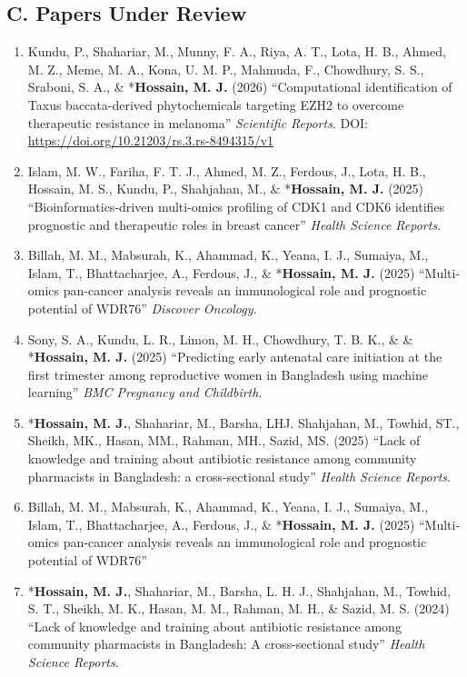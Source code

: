 \documentclass[
  11pt,
  letterpaper,
  DIV=11,
  numbers=noendperiod]{scrartcl}
\providecommand{\tightlist}{%
  \setlength{\itemsep}{0pt}\setlength{\parskip}{0pt}}
\begin{document}
\subsection{C. Papers Under Review}\label{c.-papers-under-review}

\begin{enumerate}
\def\labelenumi{\arabic{enumi}.}
\tightlist
\item
  Kundu, P., Shahariar, M., Munny, F. A., Riya, A. T., Lota, H. B.,
  Ahmed, M. Z., Meme, M. A., Kona, U. M. P., Mahmuda, F., Chowdhury, S.
  S., Sraboni, S. A., \& *\textbf{Hossain, M. J.} (2026) ``Computational
  identification of Taxus baccata-derived phytochemicals targeting EZH2
  to overcome therapeutic resistance in melanoma'' \emph{Scientific
  Reports}. DOI:
  \href{https://doi.org/https://doi.org/10.21203/rs.3.rs-8494315/v1}{https://doi.org/10.21203/rs.3.rs-8494315/v1}
\item
  Islam, M. W., Fariha, F. T. J., Ahmed, M. Z., Ferdous, J., Lota, H.
  B., Hossain, M. S., Kundu, P., Shahjahan, M., \& *\textbf{Hossain, M.
  J.} (2025) ``Bioinformatics-driven multi-omics profiling of CDK1 and
  CDK6 identifies prognostic and therapeutic roles in breast cancer''
  \emph{Health Science Reports}.\\
\item
  Billah, M. M., Mabsurah, K., Ahammad, K., Yeana, I. J., Sumaiya, M.,
  Islam, T., Bhattacharjee, A., Ferdous, J., \& *\textbf{Hossain, M. J.}
  (2025) ``Multi-omics pan-cancer analysis reveals an immunological role
  and prognostic potential of WDR76'' \emph{Discover Oncology}.\\
\item
  Sony, S. A., Kundu, L. R., Limon, M. H., Chowdhury, T. B. K., \& \&
  *\textbf{Hossain, M. J.} (2025) ``Predicting early antenatal care
  initiation at the first trimester among reproductive women in
  Bangladesh using machine learning'' \emph{BMC Pregnancy and
  Childbirth}.\\
\item
  *\textbf{Hossain, M. J.}, Shahariar, M., Barsha, LHJ. Shahjahan, M.,
  Towhid, ST., Sheikh, MK., Hasan, MM., Rahman, MH., Sazid, MS. (2025)
  ``Lack of knowledge and training about antibiotic resistance among
  community pharmacists in Bangladesh: a cross-sectional study''
  \emph{Health Science Reports}.\\
\item
  Billah, M. M., Mabsurah, K., Ahammad, K., Yeana, I. J., Sumaiya, M.,
  Islam, T., Bhattacharjee, A., Ferdous, J., \& *\textbf{Hossain, M. J.}
  (2025) ``Multi-omics pan-cancer analysis reveals an immunological role
  and prognostic potential of WDR76''\\
\item
  *\textbf{Hossain, M. J.}, Shahariar, M., Barsha, L. H. J., Shahjahan,
  M., Towhid, S. T., Sheikh, M. K., Hasan, M. M., Rahman, M. H., \&
  Sazid, M. S. (2024) ``Lack of knowledge and training about antibiotic
  resistance among community pharmacists in Bangladesh: A
  cross-sectional study'' \emph{Health Science Reports}.
\end{enumerate}
\end{document}
